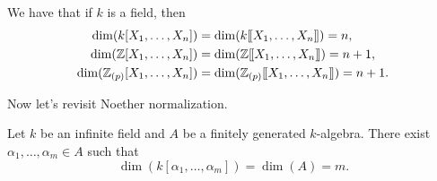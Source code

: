 \documentclass{ximera}
\begin{document}
\begin{corollary}
  We have that if $k$ is a field, then
  \begin{align*}
    \dim(k[X_1,\ldots,X_n]) &= \dim(k[\hspace{-0.25ex}[ X_1,\dots,X_n]\hspace{-0.25ex}]) = n, \\
    \dim(\mathbb Z[X_1,\ldots,X_n]) &= \dim(\mathbb Z[\hspace{-0.25ex}[ X_1,\dots,X_n]\hspace{-0.25ex}]) = n+1, \\
    \dim(\mathbb Z_{(p)}[X_1,\ldots,X_n]) &= \dim(\mathbb Z_{(p)}[\hspace{-0.25ex}[ X_1,\dots,X_n]\hspace{-0.25ex}]) = n+1.
  \end{align*}
\end{corollary}


Now let's revisit Noether normalization.

\begin{corollary}
  Let $k$ be an infinite field and $A$ be a finitely generated
  $k$-algebra. There exist $\alpha_1,\dots,\alpha_m\in A$ such that
  \[
  \dim(k[\alpha_1,\dots,\alpha_m]) = \dim(A) = m.
  \]
\end{corollary}
\end{document}
